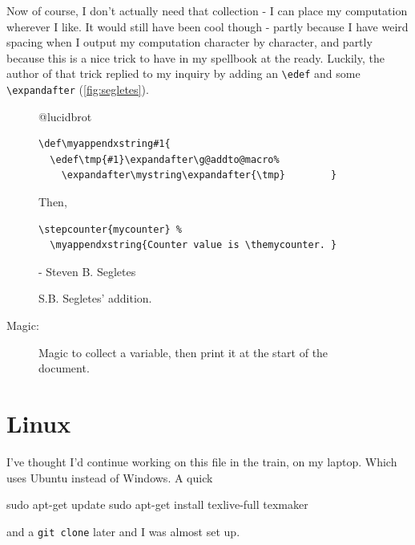 \documentclass{article} \usepackage[utf8]{inputenc}
\makeatletter
\newcommand{\code}[1]{\colorbox{codebggray}{{\texttt{#1}}}}
\def\mystring{} %
\def\thefinalstring{} %
\def\myappendstring#1{\g@addto@macro\mystring{ #1}}
\def\myappendxstring#1{\edef\tmp{#1}\expandafter\g@addto@macro\expandafter\mystring\expandafter{\tmp}}
\makeatother
\begin{document}
Now of course, I don't actually need that collection - I can place my computation wherever I like. It would still have been cool though - partly because I have weird spacing when I output my computation character by character, and partly because this is a nice trick to have in my spellbook at the ready. Luckily, the author of that trick replied to my inquiry by adding an \code{\textbackslash edef} and some \cprotect\code{\verb|\expandafter|} (\autoref{fig:segletes}).

\begin{figure}[hp]
\begin{myquote}
@lucidbrot
\begin{lstlisting}[columns=fullflexible, backgroundcolor = \color{codebggray}]
\def\myappendxstring#1{
  \edef\tmp{#1}\expandafter\g@addto@macro%
    \expandafter\mystring\expandafter{\tmp}        }
\end{lstlisting}
Then, \begin{lstlisting}[columns=fullflexible, backgroundcolor = \color{codebggray}]
\stepcounter{mycounter} %
  \myappendxstring{Counter value is \themycounter. }
\end{lstlisting}
 - Steven B. Segletes 
\end{myquote}
\caption{S.B. Segletes' addition.}
\label{fig:segletes}
\end{figure}

\makeatletter
{}%
\makeatother
Magic: \thefinalstring
\addtocontents{xyz}{\gdef\protect\thefinalstring{\mystring}}

\begin{figure}[htbp]
\begin{mycode}
\myappendstring{hello}
\makeatletter
{}%
\makeatother
\thefinalstring
\addtocontents{xyz}{\gdef\protect\thefinalstring{\mystring}}
\end{mycode}
\caption{Magic to collect a variable, then print it at the start of the document. }
\label{fig:magic}
\end{figure}

\section{Linux}
I've thought I'd continue working on this file in the train, on my laptop. Which uses Ubuntu instead of Windows. A quick
\begin{mycode}
sudo apt-get update
sudo apt-get install texlive-full texmaker
\end{mycode}
and a \code{git clone} later and I was almost set up.
\end{document}
